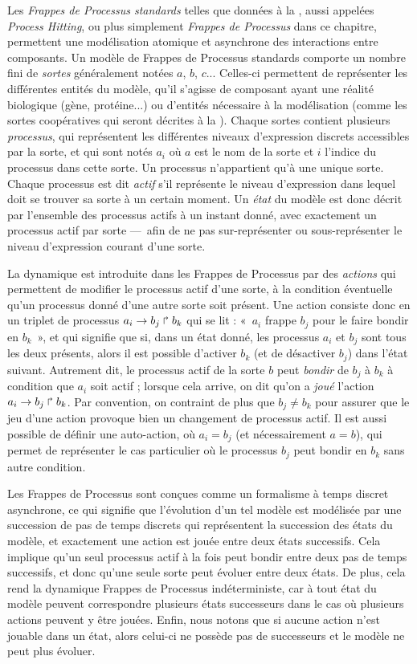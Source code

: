 Les \emph{Frappes de Processus standards} telles que données à la ,
aussi appelées \textit{Process Hitting},
ou plus simplement \emph{Frappes de Processus} dans ce chapitre,
permettent une modélisation atomique et asynchrone des interactions entre composants.
Un modèle de Frappes de Processus standards comporte un nombre fini de \emph{sortes}
généralement notées $a$, $b$, $c$...
Celles-ci permettent de représenter les différentes entités du modèle,
qu'il s'agisse de composant ayant une réalité biologique (gène, protéine...)
ou d'entités nécessaire à la modélisation (comme les sortes coopératives
qui seront décrites à la ).
Chaque sortes contient plusieurs \emph{processus},
qui représentent les différentes
niveaux d'expression discrets accessibles par la sorte,
et qui sont notés $a_i$
où $a$ est le nom de la sorte et $i$ l'indice du processus dans cette sorte.
Un processus n'appartient qu'à une unique sorte.
Chaque processus est dit \emph{actif} s'il représente le niveau d'expression
dans lequel doit se trouver sa sorte à un certain moment.
Un \emph{état} du modèle est donc décrit par l'ensemble des processus actifs à un instant donné,
avec exactement un processus actif par sorte
---~afin de ne pas sur-représenter ou sous-représenter le niveau d'expression courant d'une sorte.

La dynamique est introduite dans les Frappes de Processus par des \emph{actions}
qui permettent de modifier le processus actif d'une sorte,
à la condition éventuelle qu'un processus donné d'une autre sorte soit présent.
Une action consiste donc en un triplet de processus $a_i\rightarrow b_j\Rsh b_k$
qui se lit : «~$a_i$ frappe $b_j$ pour le faire bondir en $b_k$~»,
et qui signifie que si, dans un état donné, les processus $a_i$ et $b_j$ sont
tous les deux présents, alors il est possible d'activer $b_k$ (et de désactiver $b_j$)
dans l'état suivant.
Autrement dit, le processus actif de la sorte $b$ peut \emph{bondir}
de $b_j$ à $b_k$ à condition que $a_i$ soit actif ;
lorsque cela arrive, on dit qu'on a \emph{joué} l'action $a_i\rightarrow b_j\Rsh b_k$.
Par convention, on contraint de plus que $b_j \neq b_k$ pour assurer que le jeu d'une action
provoque bien un changement de processus actif.
Il est aussi possible de définir une auto-action, où $a_i = b_j$ (et nécessairement $a = b$),
qui permet de représenter le cas particulier où le processus $b_j$ peut bondir en $b_k$
sans autre condition.

Les Frappes de Processus sont conçues comme un formalisme
à temps discret asynchrone, ce qui signifie que
l'évolution d'un tel modèle est modélisée par une succession de pas de temps discrets
qui représentent la succession des états du modèle,
et exactement une action est jouée entre deux états successifs.
Cela implique qu'un seul processus actif à la fois peut bondir entre deux
pas de temps successifs, et donc qu'une seule sorte peut évoluer entre deux états.
De plus, cela rend la dynamique Frappes de Processus indéterministe,
car à tout état du modèle peuvent correspondre plusieurs états successeurs
dans le cas où plusieurs actions peuvent y être jouées.
Enfin, nous notons que si aucune action n'est jouable dans un état, alors celui-ci
ne possède pas de successeurs et le modèle ne peut plus évoluer.

